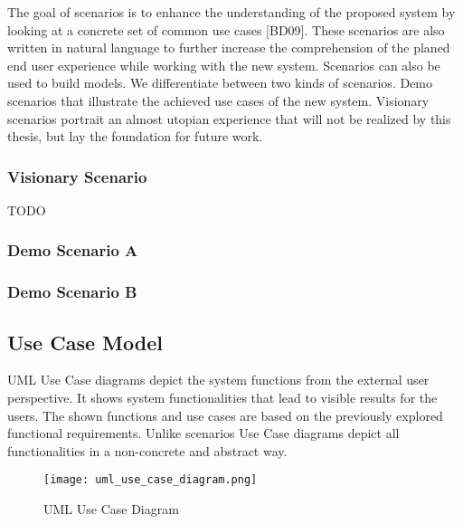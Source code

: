 The goal of scenarios is to enhance the understanding of the proposed system by looking at a concrete set of common use cases [BD09].
These scenarios are also written in natural language to further increase the comprehension of the planed end user experience while working with the new system.
Scenarios can also be used to build models. We differentiate between two kinds of scenarios.
Demo scenarios that illustrate the achieved use cases of the new system.
Visionary scenarios portrait an almost utopian experience that will not be realized by this thesis, but lay the foundation for future work.

\subsubsection{Visionary Scenario}
TODO
\subsubsection{Demo Scenario A}

\subsubsection{Demo Scenario B}

\subsection{Use Case Model}

UML Use Case diagrams depict the system functions from the external user perspective.
It shows system functionalities that lead to visible results for the users.
The shown functions and use cases are based on the previously explored functional requirements.
Unlike scenarios Use Case diagrams depict all functionalities in a non-concrete and abstract way.

\begin{figure}[p]
    \begin{adjustwidth}{-0.1\paperwidth}{-0.1\paperwidth}
        \centering
        \texttt{[image: uml\_use\_case\_diagram.png]}
        \caption{UML Use Case Diagram}
        \label{fig:uml_use_case_diagram}
    \end{adjustwidth}
\end{figure}

